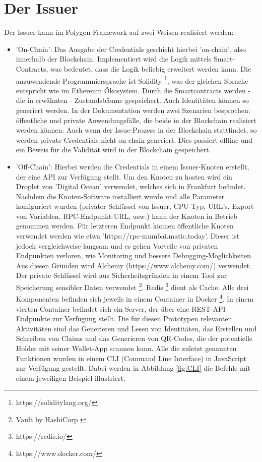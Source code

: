 \section{Der Issuer}
Der Issuer kann im Polygon-Framework auf zwei Weisen realisiert werden:
\begin{itemize}
	\item 'On-Chain': Das Ausgabe der Credentials geschieht hierbei 'on-chain', also innerhalb der Blockchain. Implementiert wird die Logik mittels Smart-Contracts, was bedeutet, dass die Logik beliebig erweitert werden kann. Die anzuwendende Programmiersprache ist Solidity \footnote{https://soliditylang.org/}, was der gleichen Sprache entspricht wie im Ethereum Ökosystem. Durch die Smartcontracts werden - die in  erwähnten - Zustandsbäume gespeichert. Auch Identitäten können so generiert  werden. In der Dokumentation werden zwei Szenarien besprochen: öffentliche und private Anwendungsfälle, die beide in der Blockchain realisiert werden können. Auch wenn der Issue-Prozess in der Blockchain stattfindet, so werden private Credentials nicht on-chain generiert. Dies passiert offline und ein Beweis für die Validität wird in der Blockchain gespeichert.
	\item  'Off-Chain': Hierbei werden die Credentials in einem Issuer-Knoten erstellt, der eine API zur Verfügung stellt. Um den Knoten zu hosten wird ein Droplet von 'Digital Ocean' verwendet,  welches sich in Frankfurt befindet. Nachdem die Knoten-Software installiert wurde und alle Parameter konfiguriert wurden (privater Schlüssel von Issuer, CPU-Typ, URL's, Export von Variablen, RPC-Endpunkt-URL, usw.) kann der Knoten in Betrieb genommen werden. Für letzteren Endpunkt können öffentliche Knoten verwendet werden wie etwa 'https://rpc-mumbai.matic.today'. Dieser ist jedoch vergleichweise langsam und es gehen Vorteile von privaten Endpunkten verloren, wie Monitoring und bessere Debugging-Möglichkeiten. Aus diesen Gründen wird Alchemy (https://www.alchemy.com/) verwendet. Der private Schlüssel wird aus Sicherheitsgründen in einem Tool zur Speicherung sensibler Daten verwendet \footnote{Vault by HashiCorp \label{vault}}. Redis \footnote{https://redis.io/} dient als Cache. Alle drei Komponenten befinden sich jeweils in einem Container in Docker \footnote{https://www.docker.com/}. In einem vierten Container befindet sich ein Server, der über eine REST-API Endpunkte zur Verfügung stellt. Die für diesen Prototypen relevanten Aktivitäten sind das Generieren und Lesen von Identitäten, das Erstellen und Schreiben von Claims und das Generieren von QR-Codes, die der potentielle Holder mit seiner Wallet-App scannen kann. Alle die zuletzt genannten Funktionen wurden in einem CLI (Command Line Interface) in JavaScript zur Verfügung gestellt. Dabei werden in Abbildung \ref{fig:CLI} die Befehle mit einem jeweiligen Beispiel illustriert.
	

\end{itemize}
